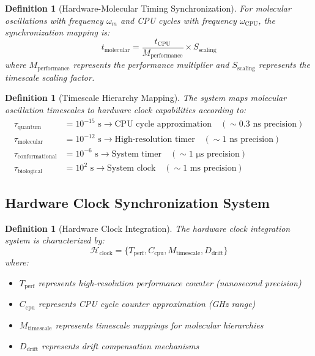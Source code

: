 \documentclass[12pt,a4paper]{article}
\newtheorem{definition}[theorem]{Definition}
\begin{document}
\begin{definition}[Hardware-Molecular Timing Synchronization]
For molecular oscillations with frequency $\omega_m$ and CPU cycles with frequency $\omega_{\text{CPU}}$, the synchronization mapping is:
\begin{equation}
t_{\text{molecular}} = \frac{t_{\text{CPU}}}{M_{\text{performance}}} \times S_{\text{scaling}}
\end{equation}
where $M_{\text{performance}}$ represents the performance multiplier and $S_{\text{scaling}}$ represents the timescale scaling factor.
\end{definition}

\begin{definition}[Timescale Hierarchy Mapping]
The system maps molecular oscillation timescales to hardware clock capabilities according to:
\begin{align}
\tau_{\text{quantum}} &= 10^{-15} \text{ s} \rightarrow \text{CPU cycle approximation} \quad (\sim 0.3 \text{ ns precision}) \\
\tau_{\text{molecular}} &= 10^{-12} \text{ s} \rightarrow \text{High-resolution timer} \quad (\sim 1 \text{ ns precision}) \\
\tau_{\text{conformational}} &= 10^{-6} \text{ s} \rightarrow \text{System timer} \quad (\sim 1 \text{ μs precision}) \\
\tau_{\text{biological}} &= 10^{2} \text{ s} \rightarrow \text{System clock} \quad (\sim 1 \text{ ms precision})
\end{align}
\end{definition}

\subsection{Hardware Clock Synchronization System}

\begin{definition}[Hardware Clock Integration]
The hardware clock integration system is characterized by:
\begin{equation}
\mathcal{H}_{\text{clock}} = \{T_{\text{perf}}, C_{\text{cpu}}, M_{\text{timescale}}, D_{\text{drift}}\}
\end{equation}
where:
\begin{itemize}
\item $T_{\text{perf}}$ represents high-resolution performance counter (nanosecond precision)
\item $C_{\text{cpu}}$ represents CPU cycle counter approximation (GHz range)
\item $M_{\text{timescale}}$ represents timescale mappings for molecular hierarchies
\item $D_{\text{drift}}$ represents drift compensation mechanisms
\end{itemize}
\end{definition}
\end{document}
